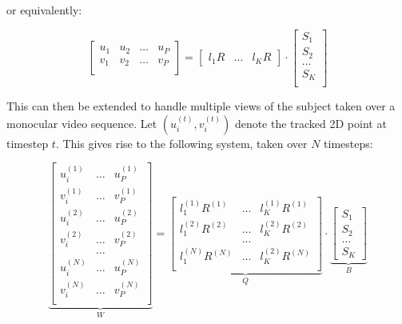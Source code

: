     or equivalently:

    \begin{equation}
        \begin{bmatrix}
            u_{1} & u_{2} & \dots & u_{P} \\
            v_{1} & v_{2} & \dots & v_{P} \\
        \end{bmatrix}
        = 
        \begin{bmatrix}
            l_{1}R & \dots & l_{K}R
        \end{bmatrix}
        \cdot
        \begin{bmatrix}
            S_{1} \\
            S_{2} \\
            \dots \\
            S_{K} \\
        \end{bmatrix}
    \end{equation}

    \def\PT#1#2#3{#1_{#2}^{(#3)}}
    \def\T#1#2{#1^{(#2)}}

    This can then be extended to handle multiple views of the subject taken over a monocular video sequence. Let $(\PT{u}{i}{t}, \PT{v}{i}{t})$ denote the tracked 2D point at timestep $t$. This gives rise to the following system, taken over $N$ timesteps:

    \begin{equation}
        \underbrace{
        \begin{bmatrix}
            \PT{u}{i}{1} & \dots & \PT{u}{P}{1} \\
            \PT{v}{i}{1} & \dots & \PT{v}{P}{1} \\
            \PT{u}{i}{2} & \dots & \PT{u}{P}{2} \\
            \PT{v}{i}{2} & \dots & \PT{v}{P}{2} \\
            & \dots & \\
            \PT{u}{i}{N} & \dots & \PT{u}{P}{N} \\
            \PT{v}{i}{N} & \dots & \PT{v}{P}{N} \\
        \end{bmatrix}
        }_{W}
        = 
        \underbrace{
        \begin{bmatrix}
            \PT{l}{1}{1}\T{R}{1} & \dots & \PT{l}{K}{1}\T{R}{1} \\
            \PT{l}{1}{2}\T{R}{2} & \dots & \PT{l}{K}{2}\T{R}{2} \\
            & \dots & \\
            \PT{l}{1}{N}\T{R}{N} & \dots & \PT{l}{K}{2}\T{R}{N} \\
        \end{bmatrix}
        }_{Q}
        \cdot
        \underbrace{
        \begin{bmatrix}
            S_{1} \\
            S_{2} \\
            \dots \\
            S_{K}
        \end{bmatrix}
        }_{B}
    \end{equation}


